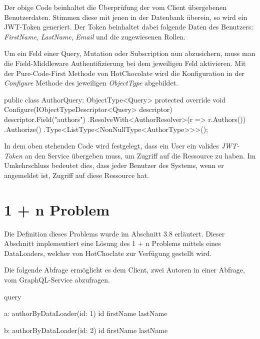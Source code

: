 Der obige Code beinhaltet die Überprüfung der vom Client übergebenen Benutzerdaten.
Stimmen diese mit jenen in der Datenbank überein, so wird ein JWT-Token generiert.
Der Token beinhaltet dabei folgende Daten des Benutzers: \textit{FirstName}, \textit{LastName}, \textit{Email} und die zugewiesenen Rollen.

Um ein Feld einer Query, Mutation oder Subscription nun abzusichern, muss man die Field-Middleware Authentifizierung bei dem jeweiligen Feld aktivieren.
Mit der Pure-Code-First Methode von HotChocolate wird die Konfiguration in der \textit{Configure} Methode des jeweiligen \textit{ObjectType} abgebildet.

\begin{JsCode}
public class AuthorQuery: ObjectType<Query> {
    protected override void Configure(IObjectTypeDescriptor<Query> descriptor) {
        descriptor.Field("authors")
            .ResolveWith<AuthorResolver>(r => r.Authors())
            .Authorize()
            .Type<ListType<NonNullType<AuthorType>>>();
    }
}
\end{JsCode}

In dem oben stehenden Code wird festgelegt, dass ein User ein valides \textit{JWT-Token} an den Service übergeben muss, um Zugriff auf die Ressource zu haben.
Im Umkehrschluss bedeutet dies, dass jeder Benutzer des Systems, wenn er angemeldet ist, Zugriff auf diese Ressource hat.
\newline

\section{1 + n Problem}
Die Definition dieses Problems wurde im Abschnitt 3.8 erläutert.
Dieser Abschnitt implementiert eine Lösung des 1 + n Problems mittels eines DataLoaders, welcher von HotChoclate zur Verfügung gestellt wird.
\newline

Die folgende Abfrage ermöglicht es dem Client, zwei Autoren in einer Abfrage, vom GraphQL-Service abzufragen.
\begin{JsCode}
query {
    a: authorByDataLoader(id: 1) {
        id
        firstName
        lastName
    }
    
    b: authorByDataLoader(id: 2) {
        id
        firstName
        lastName
    }
}
\end{JsCode}

